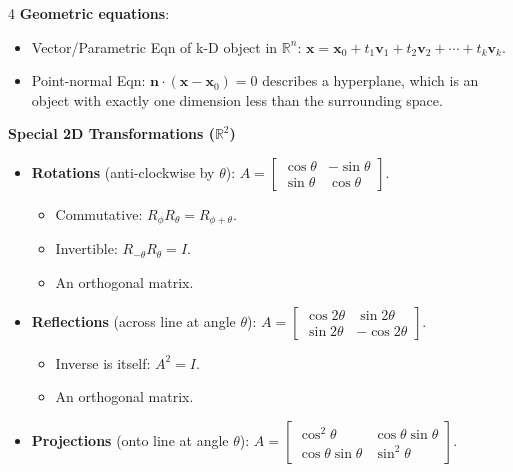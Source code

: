 \documentclass[9pt]{extarticle}
\begin{document}
\begin{multicols*}{4}
\textbf{Geometric equations}:
\begin{itemize}
    \item Vector/Parametric Eqn of k-D object in $\mathbb{R}^{n}$: $\mathbf{x}=\mathbf{x}_{0}+t_{1}\mathbf{v}_{1}+t_{2}\mathbf{v}_{2}+\cdots+t_{k}\mathbf{v}_{k}$.
    \item Point-normal Eqn: $\mathbf{n}\cdot(\mathbf{x}-\mathbf{x}_{0})=0$ describes a hyperplane, which is an object with exactly one dimension less than the surrounding space.
\end{itemize}
\textbf{Special 2D Transformations ($\mathbb{R}^2$)}
\begin{itemize}
    \item \textbf{Rotations} (anti-clockwise by $\theta$): $A=\begin{bmatrix}\cos\theta & -\sin\theta \\ \sin\theta & \cos\theta\end{bmatrix}$. 
    \begin{itemize}
        \item Commutative: $R_\phi R_\theta = R_{\phi+\theta}$. 
        \item Invertible: $R_{-\theta}R_\theta = I$.
        \item An orthogonal matrix.
    \end{itemize}
    \item \textbf{Reflections} (across line at angle $\theta$): $A=\begin{bmatrix}\cos 2\theta & \sin 2\theta \\ \sin 2\theta & -\cos 2\theta\end{bmatrix}$. 
    \begin{itemize}
        \item Inverse is itself: $A^2=I$.
        \item An orthogonal matrix.
    \end{itemize}
    \item \textbf{Projections} (onto line at angle $\theta$): $A=\begin{bmatrix}\cos^2\theta & \cos\theta\sin\theta \\ \cos\theta\sin\theta & \sin^2\theta\end{bmatrix}$.
\end{itemize}


\end{multicols*}
\end{document}
